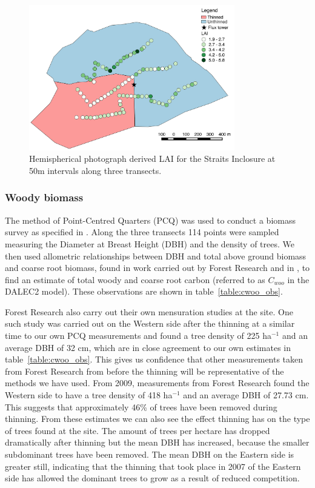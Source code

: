 \documentclass[draft,linenumbers]{agujournal}
\begin{document}
\begin{figure}[ht]
    \centering
    \includegraphics[width=0.8\textwidth]{thinned.pdf}
    \caption{Hemispherical photograph derived LAI for the Straits Inclosure at 50m intervals along three transects.} \label{fig:hemi_lai}
\end{figure}

\subsubsection{Woody biomass}  
The method of Point-Centred Quarters (PCQ) was used to conduct a biomass survey as specified in \citet{dahdouh2006empirical}. Along the three transects 114 points were sampled measuring the Diameter at Breast Height (DBH) and the density of trees. We then used allometric relationships between DBH and total above ground biomass and coarse root biomass, found in work carried out by Forest Research and in \citet{mckay2003woodfuel}, to find an estimate of total woody and coarse root carbon (referred to as \(C_{woo}\) in the DALEC2 model). These observations are shown in table~\ref{table:cwoo_obs}.

Forest Research also carry out their own mensuration studies at the site. One such study was carried out on the Western side after the thinning at a similar time to our own PCQ measurements and found a tree density of 225 ha\(^{-1}\) and an average DBH of 32 cm, which are in close agreement to our own estimates in table~\ref{table:cwoo_obs}. This gives us confidence that other measurements taken from Forest Research from before the thinning will be representative of the methods we have used. From 2009, measurements from Forest Research found the Western side to have a tree density of 418 ha\(^{-1}\) and an average DBH of 27.73 cm. This suggests that approximately 46\% of trees have been removed during thinning. From these estimates we can also see the effect thinning has on the type of trees found at the site. The amount of trees per hectare has dropped dramatically after thinning but the mean DBH has increased, because the smaller subdominant trees have been removed. The mean DBH on the Eastern side is greater still, indicating that the thinning that took place in 2007 of the Eastern side has allowed the dominant trees to grow as a result of reduced competition.
\end{document}
